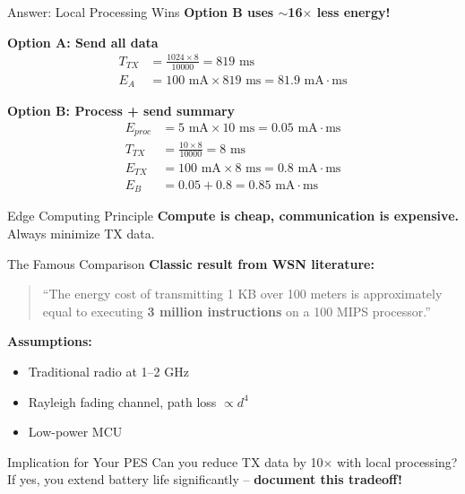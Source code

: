 \documentclass[aspectratio=169,11pt]{beamer}
\begin{document}
\begin{frame}{Answer: Local Processing Wins}
    \textbf{Option B uses $\sim$16$\times$ less energy!}
    
    \vspace{0.3cm}
    \textbf{Option A: Send all data}
    \begin{align*}
        T_{TX} &= \frac{1024 \times 8}{10000} = 819 \text{ ms} \\
        E_A &= 100 \text{ mA} \times 819 \text{ ms} = 81.9 \text{ mA} \cdot \text{ms}
    \end{align*}
    
    \textbf{Option B: Process + send summary}
    \begin{align*}
        E_{proc} &= 5 \text{ mA} \times 10 \text{ ms} = 0.05 \text{ mA} \cdot \text{ms} \\
        T_{TX} &= \frac{10 \times 8}{10000} = 8 \text{ ms} \\
        E_{TX} &= 100 \text{ mA} \times 8 \text{ ms} = 0.8 \text{ mA} \cdot \text{ms} \\
        E_B &= 0.05 + 0.8 = 0.85 \text{ mA} \cdot \text{ms}
    \end{align*}
    
    \begin{block}{Edge Computing Principle}
        \textbf{Compute is cheap, communication is expensive.} Always minimize TX data.
    \end{block}
\end{frame}

\begin{frame}{The Famous Comparison}
    \textbf{Classic result from WSN literature:}
    
    \vspace{0.3cm}
    \begin{quote}
        ``The energy cost of transmitting 1 KB over 100 meters is approximately equal to executing \textbf{3 million instructions} on a 100 MIPS processor.''
    \end{quote}
    
    \vspace{0.3cm}
    \textbf{Assumptions:}
    \begin{itemize}
        \item Traditional radio at 1--2 GHz
        \item Rayleigh fading channel, path loss $\propto d^4$
        \item Low-power MCU
    \end{itemize}
    
    \vspace{0.3cm}
    \begin{alertblock}{Implication for Your PES}
        Can you reduce TX data by 10$\times$ with local processing?\\
        If yes, you extend battery life significantly -- \textbf{document this tradeoff!}
    \end{alertblock}
\end{frame}
\end{document}
